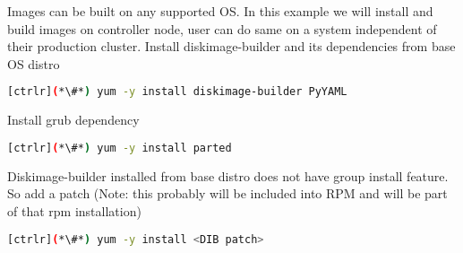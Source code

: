 
Images can be built on any supported OS. In this example we will install and build images on controller node, user can do same on a system independent of their production cluster. Install diskimage-builder and its dependencies from base OS distro

\begin{lstlisting}[language=bash,keywords={}]
[ctrlr](*\#*) yum -y install diskimage-builder PyYAML
\end{lstlisting}

Install grub dependency

\begin{lstlisting}[language=bash,keywords={}]
[ctrlr](*\#*) yum -y install parted
\end{lstlisting}

Diskimage-builder installed from base distro does not have group install feature. So add a patch (Note: this probably will be included into RPM and will be part of that rpm installation)

\begin{lstlisting}[language=bash,keywords={}]
[ctrlr](*\#*) yum -y install <DIB patch>
\end{lstlisting}
